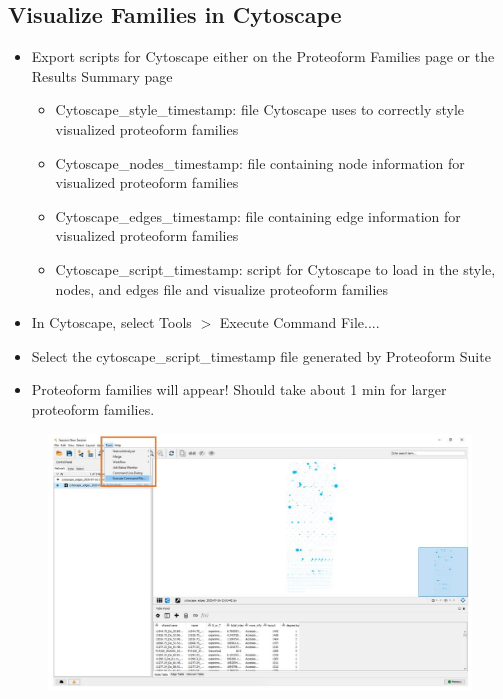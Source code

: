 \subsection{Visualize Families in Cytoscape}
\begin{itemize}
	\item Export scripts for Cytoscape either on the Proteoform Families page or the Results Summary page
	\begin{itemize}
		\item Cytoscape\_style\_timestamp: file Cytoscape uses to correctly style visualized proteoform families
		\item Cytoscape\_nodes\_timestamp: file containing node information for visualized proteoform families
		\item Cytoscape\_edges\_timestamp: file containing edge information for visualized proteoform families
		\item Cytoscape\_script\_timestamp: script for Cytoscape to load in the style, nodes, and edges file and visualize proteoform families
	\end{itemize}
	\item In Cytoscape, select Tools $>$ Execute Command File.... 
	\item Select the cytoscape\_script\_timestamp file generated by Proteoform Suite
	\item Proteoform families will appear! Should take about 1 min for larger proteoform families.
\end{itemize}
\begin{figure}[h]
\centering
\includegraphics[scale=0.45]{figures/cytoscape1.jpg}
\end{figure}

\pagebreak
